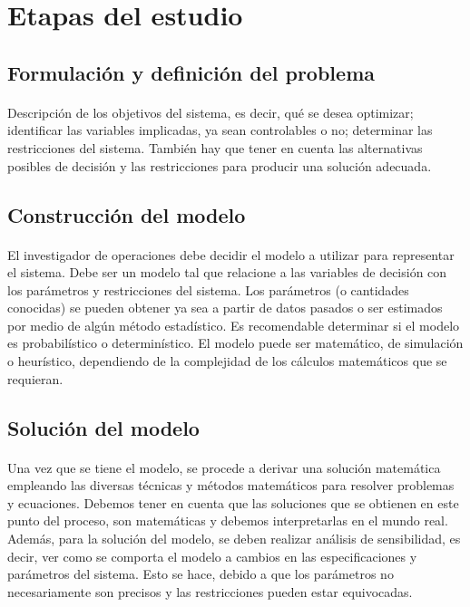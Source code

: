 \documentclass[12pt, a4paper,spanish]{article}
\begin{document}
	\section{Etapas del estudio}
		\paragraph{}

		\subsection{Formulación y definición del problema}

			\paragraph{}
			Descripción de los objetivos del sistema, es decir, qué se desea optimizar; identificar las variables implicadas, ya sean controlables o no; determinar las restricciones del sistema. También hay que tener en cuenta las alternativas posibles de decisión y las restricciones para producir una solución adecuada.\cite{invdeop_IO}

		\subsection{Construcción del modelo}

			\paragraph{}
			El investigador de operaciones debe decidir el modelo a utilizar para representar el sistema. Debe ser un modelo tal que relacione a las variables de decisión con los parámetros y restricciones del sistema. Los parámetros (o cantidades conocidas) se pueden obtener ya sea a partir de datos pasados o ser estimados por medio de algún método estadístico. Es recomendable determinar si el modelo es probabilístico o determinístico. El modelo puede ser matemático, de simulación o heurístico, dependiendo de la complejidad de los cálculos matemáticos que se requieran.\cite{invdeop_IO}

		\subsection{Solución del modelo}

			\paragraph{}
			Una vez que se tiene el modelo, se procede a derivar una solución matemática empleando las diversas técnicas y métodos matemáticos para resolver problemas y ecuaciones. Debemos tener en cuenta que las soluciones que se obtienen en este punto del proceso, son matemáticas y debemos interpretarlas en el mundo real. Además, para la solución del modelo, se deben realizar análisis de sensibilidad, es decir, ver como se comporta el modelo a cambios en las especificaciones y parámetros del sistema. Esto se hace, debido a que los parámetros no necesariamente son precisos y las restricciones pueden estar equivocadas.\cite{invdeop_IO}
\end{document}
